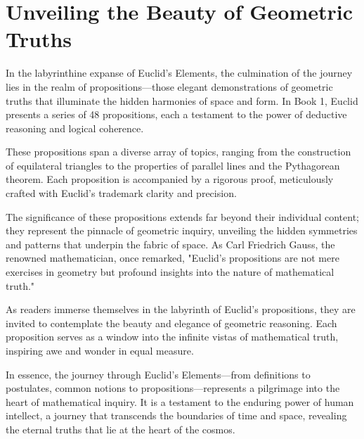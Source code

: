 \section{Unveiling the Beauty of Geometric Truths}

In the labyrinthine expanse of Euclid's Elements, the culmination of the journey lies in the realm of propositions—those elegant demonstrations of geometric truths that illuminate the hidden harmonies of space and form. In Book 1, Euclid presents a series of 48 propositions, each a testament to the power of deductive reasoning and logical coherence.

These propositions span a diverse array of topics, ranging from the construction of equilateral triangles to the properties of parallel lines and the Pythagorean theorem. Each proposition is accompanied by a rigorous proof, meticulously crafted with Euclid's trademark clarity and precision.

The significance of these propositions extends far beyond their individual content; they represent the pinnacle of geometric inquiry, unveiling the hidden symmetries and patterns that underpin the fabric of space. As Carl Friedrich Gauss, the renowned mathematician, once remarked, "Euclid's propositions are not mere exercises in geometry but profound insights into the nature of mathematical truth."

As readers immerse themselves in the labyrinth of Euclid's propositions, they are invited to contemplate the beauty and elegance of geometric reasoning. Each proposition serves as a window into the infinite vistas of mathematical truth, inspiring awe and wonder in equal measure.

In essence, the journey through Euclid's Elements—from definitions to postulates, common notions to propositions—represents a pilgrimage into the heart of mathematical inquiry. It is a testament to the enduring power of human intellect, a journey that transcends the boundaries of time and space, revealing the eternal truths that lie at the heart of the cosmos.
